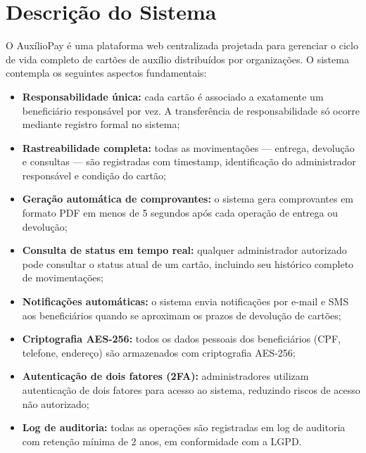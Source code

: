\documentclass[
  article,
  a4paper,
  12pt,
  oneside,
  fleqn
]{abntex2}
\begin{document}
\section{Descrição do Sistema}

O AuxílioPay é uma plataforma web centralizada projetada para gerenciar o ciclo de vida completo de cartões de auxílio distribuídos por organizações. O sistema contempla os seguintes aspectos fundamentais:

\begin{itemize}
    \item \textbf{Responsabilidade única:} cada cartão é associado a exatamente um beneficiário responsável por vez. A transferência de responsabilidade só ocorre mediante registro formal no sistema;
    \item \textbf{Rastreabilidade completa:} todas as movimentações --- entrega, devolução e consultas --- são registradas com timestamp, identificação do administrador responsável e condição do cartão;
    \item \textbf{Geração automática de comprovantes:} o sistema gera comprovantes em formato PDF em menos de 5 segundos após cada operação de entrega ou devolução;
    \item \textbf{Consulta de status em tempo real:} qualquer administrador autorizado pode consultar o status atual de um cartão, incluindo seu histórico completo de movimentações;
    \item \textbf{Notificações automáticas:} o sistema envia notificações por e-mail e SMS aos beneficiários quando se aproximam os prazos de devolução de cartões;
    \item \textbf{Criptografia AES-256:} todos os dados pessoais dos beneficiários (CPF, telefone, endereço) são armazenados com criptografia AES-256;
    \item \textbf{Autenticação de dois fatores (2FA):} administradores utilizam autenticação de dois fatores para acesso ao sistema, reduzindo riscos de acesso não autorizado;
    \item \textbf{Log de auditoria:} todas as operações são registradas em log de auditoria com retenção mínima de 2 anos, em conformidade com a LGPD.
\end{itemize}

\end{document}
